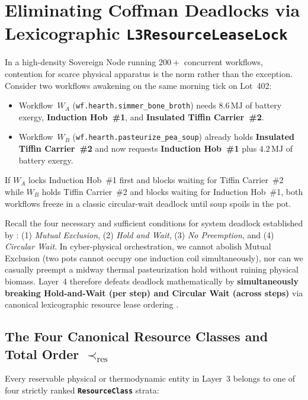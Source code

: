 \section{Eliminating Coffman Deadlocks via Lexicographic \texttt{L3ResourceLeaseLock}}
\label{sec:ch3-resource-leases}

In a high-density Sovereign Node running $200+$ concurrent workflows, contention for scarce
physical apparatus is the norm rather than the exception. Consider two workflows awakening
on the same morning tick on Lot~402:
\begin{itemize}
\item Workflow~$W_A$ (\texttt{wf.hearth.simmer\_bone\_broth}) needs $8.6\,\mathrm{MJ}$ of
        battery exergy, \textbf{Induction Hob~\#1}, and \textbf{Insulated Tiffin
        Carrier~\#2}.
\item Workflow~$W_B$ (\texttt{wf.hearth.pasteurize\_pea\_soup}) already holds
        \textbf{Insulated Tiffin Carrier~\#2} and now requests \textbf{Induction Hob~\#1}
        plus $4.2\,\mathrm{MJ}$ of battery exergy.
\end{itemize}
If $W_A$ locks Induction Hob~\#1 first and blocks waiting for Tiffin Carrier~\#2 while $W_B$
holds Tiffin Carrier~\#2 and blocks waiting for Induction Hob~\#1, both workflows freeze in
a classic circular-wait deadlock until soup spoils in the pot.

Recall the four necessary and sufficient conditions for system deadlock established by
\textcite{coffman1971deadlocks}: (1) \textit{Mutual Exclusion}, (2) \textit{Hold and Wait},
(3) \textit{No Preemption}, and (4) \textit{Circular Wait}. In cyber-physical orchestration,
we cannot abolish Mutual Exclusion (two pots cannot occupy one induction coil
simultaneously), nor can we casually preempt a midway thermal pasteurization hold without
ruining physical biomass. Layer~4 therefore defeats deadlock mathematically by
\textbf{simultaneously breaking Hold-and-Wait (per step) and Circular Wait (across steps)}
via canonical lexicographic resource lease ordering
\parencite{dennis1966programming,coffman1971deadlocks}.

\subsection{The Four Canonical Resource Classes and Total Order $\prec_{\mathrm{res}}$}

Every reservable physical or thermodynamic entity in Layer~3 belongs to one of four strictly
ranked \textbf{\texttt{ResourceClass}} strata:

